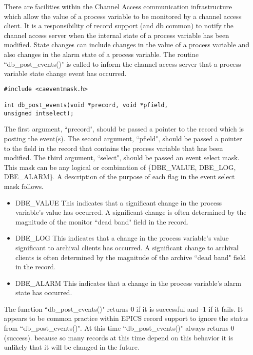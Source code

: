 There are facilities within the Channel Access communication infrastructure which allow the value of a process variable 
to be monitored by a channel access client. It is a responsibility of record support (and db common) to notify the channel 
access server when the internal state of a process variable has been modified. State changes can include changes in the 
value of a process variable and also changes in the alarm state of a process variable. The routine ``db\_post\_events()" is 
called to inform the channel access server that a process variable state change event has occurred.

\begin{verbatim}#include <caeventmask.h>

int db_post_events(void *precord, void *pfield,
unsigned intselect);
\end{verbatim}The first argument, ``precord", should be passed a pointer to the record which is posting the event(s). The second 
argument, ``pfield", should be passed a pointer to the field in the record that contains the process variable that has been 
modified. The third argument, ``select", should be passed an event select mask. This mask can be any logical or 
combination of \{DBE\_VALUE, DBE\_LOG, DBE\_ALARM\}. A description of the purpose of each flag in the event select 
mask follows.

\begin{itemize}\item DBE\_VALUE This indicates that a significant change in the process variable's value has occurred. A significant 
change is often determined by the magnitude of the monitor ``dead band" field in the record.

\item DBE\_LOG This indicates that a change in the process variable's value significant to archival clients has occurred. 
A significant change to archival clients is often determined by the magnitude of the archive ``dead band" field in 
the record.

\item DBE\_ALARM This indicates that a change in the process variable's alarm state has occurred.

\end{itemize}The function ``db\_post\_events()" returns 0 if it is successful and -1 if it fails. It appears to be common practice within 
EPICS record support to ignore the status from ``db\_post\_events()". At this time ``db\_post\_events()" always returns 0 
(success). because so many records at this time depend on this behavior it is unlikely that it will be changed in the future.


